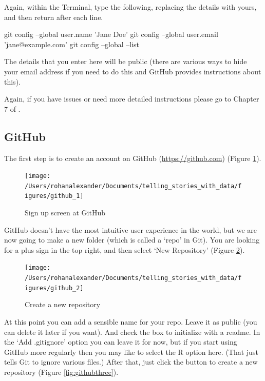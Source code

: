 \documentclass[
]{book}
\newenvironment{Shaded}{\begin{snugshade}}{\end{snugshade}}
\newcommand{\FunctionTok}[1]{\textcolor[rgb]{0.00,0.00,0.00}{#1}}
\newcommand{\NormalTok}[1]{#1}
\newcommand{\StringTok}[1]{\textcolor[rgb]{0.31,0.60,0.02}{#1}}
\begin{document}
Again, within the Terminal, type the following, replacing the details with yours, and then return after each line.

\begin{Shaded}
\begin{Highlighting}[]
\FunctionTok{git}\NormalTok{ config --global user.name }\StringTok{'Jane Doe'}
\FunctionTok{git}\NormalTok{ config --global user.email }\StringTok{'jane@example.com'}
\FunctionTok{git}\NormalTok{ config --global --list}
\end{Highlighting}
\end{Shaded}

The details that you enter here will be public (there are various ways to hide your email address if you need to do this and GitHub provides instructions about this).

Again, if you have issues or need more detailed instructions please go to Chapter 7 of \citet{happygit}.

\hypertarget{github}{%
\subsection{GitHub}\label{github}}

The first step is to create an account on GitHub (\url{https://github.com}) (Figure \ref{fig:githubone}).

\begin{figure}
\texttt{[image: /Users/rohanalexander/Documents/telling\_stories\_with\_data/figures/github\_1]} \caption{Sign up screen at GitHub}\label{fig:githubone}
\end{figure}

GitHub doesn't have the most intuitive user experience in the world, but we are now going to make a new folder (which is called a `repo' in Git). You are looking for a plus sign in the top right, and then select `New Repository' (Figure \ref{fig:githubtwo}).

\begin{figure}
\texttt{[image: /Users/rohanalexander/Documents/telling\_stories\_with\_data/figures/github\_2]} \caption{Create a new repository}\label{fig:githubtwo}
\end{figure}

At this point you can add a sensible name for your repo. Leave it as public (you can delete it later if you want). And check the box to initialize with a readme. In the `Add .gitignore' option you can leave it for now, but if you start using GitHub more regularly then you may like to select the R option here. (That just tells Git to ignore various files.) After that, just click the button to create a new repository (Figure \ref{fig:githubthree}).
\end{document}
